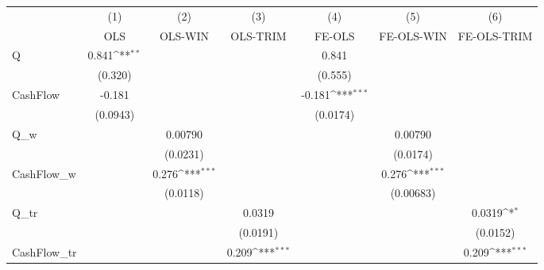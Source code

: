 {
\def\sym#1{\ifmmode^{#1}\else\(^{#1}\)\fi}
\begin{tabular}{l*{6}{c}}
\hline\hline
            &\multicolumn{1}{c}{(1)}         &\multicolumn{1}{c}{(2)}         &\multicolumn{1}{c}{(3)}         &\multicolumn{1}{c}{(4)}         &\multicolumn{1}{c}{(5)}         &\multicolumn{1}{c}{(6)}         \\
            &         OLS         &     OLS-WIN         &    OLS-TRIM         &      FE-OLS         &  FE-OLS-WIN         & FE-OLS-TRIM         \\
\hline
Q           &       0.841\sym{**} &                     &                     &       0.841         &                     &                     \\
            &     (0.320)         &                     &                     &     (0.555)         &                     &                     \\
CashFlow    &      -0.181         &                     &                     &      -0.181\sym{***}&                     &                     \\
            &    (0.0943)         &                     &                     &    (0.0174)         &                     &                     \\
Q\_w         &                     &     0.00790         &                     &                     &     0.00790         &                     \\
            &                     &    (0.0231)         &                     &                     &    (0.0174)         &                     \\
CashFlow\_w  &                     &       0.276\sym{***}&                     &                     &       0.276\sym{***}&                     \\
            &                     &    (0.0118)         &                     &                     &   (0.00683)         &                     \\
Q\_tr        &                     &                     &      0.0319         &                     &                     &      0.0319\sym{*}  \\
            &                     &                     &    (0.0191)         &                     &                     &    (0.0152)         \\
CashFlow\_tr &                     &                     &       0.209\sym{***}&                     &                     &       0.209\sym{***}\\

\end{tabular}}
